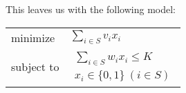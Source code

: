 \documentclass[]{article}
\begin{document}
This leaves us with the following model:

\centering
\def\arraystretch{4} %
\begin{tabular}{ll}
  minimize   & $
    \displaystyle\sum_{i \in S}v_i x_i
  $              \\
  subject to & $
    \begin{align}
      \sum_{i \in S}w_i x_i \leq K
      \\
      x_i \in \{0,1\} \ (i \in S)
    \end{align}
  $              \\
\end{tabular}
\end{document}
